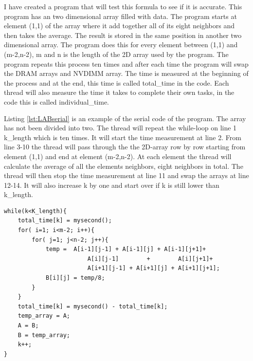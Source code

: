 \documentclass[12pt,a4paper,USenglish]{article}      %
\begin{document}

I have created a program that will test this formula to see if it is accurate.
This program has an two dimensional array filled with data. The program starts at element (1,1) of the array where it add together all of its eight neighbors and then takes the average. The result is stored in the same position in another two dimensional array. The program does this for every element between (1,1) and (m-2,n-2), m and n is the length of the 2D array used by the program. 
The program repeats this process ten times and after each time the program will swap the DRAM arrays and NVDIMM array. The time is measured at the beginning of the process and at the end, this time is called total\_time in the code.
Each thread will also measure the time it takes to complete their own tasks, in the code this is called individual\_time.

Listing \ref{lst:LABserial} is an example of the serial code of the program. The array has not been divided into two.
The thread will repeat the while-loop on line 1 k\_length which is ten times. It will start the time measurement at line 2. From line 3-10 the thread will pass through the the 2D-array row by row starting from element (1,1) and end at element (m-2,n-2). At each element the thread will calculate the average of all the elements neighbors, eight neighbors in total.
The thread will then stop the time measurement at line 11 and swap the arrays at line 12-14.
It will also increase k by one and start over if k is still lower than k\_length.

\begin{lstlisting}[caption={Serial code that will be used in the first and second versions.}, label={lst:LABserial}]
while(k<K_length){
	total_time[k] = mysecond();
	for( i=1; i<m-2; i++){
		for( j=1; j<n-2; j++){
			temp =  A[i-1][j-1] + A[i-1][j] + A[i-1][j+1]+
					    A[i][j-1]        +        A[i][j+1]+
					    A[i+1][j-1] + A[i+1][j] + A[i+1][j+1];
			B[i][j] = temp/8;
		}
	}
	total_time[k] = mysecond() - total_time[k];
	temp_array = A;
	A = B;
	B = temp_array;
	k++;
}
\end{lstlisting}
\end{document}
